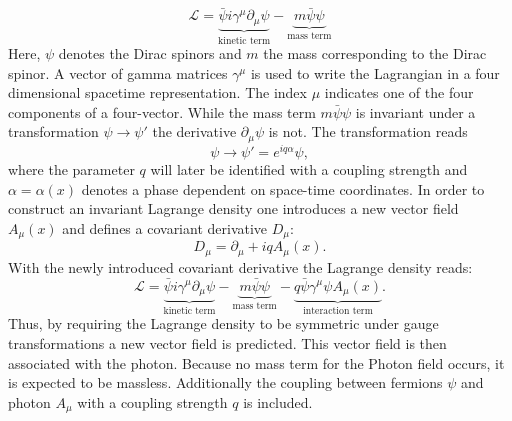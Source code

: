 	\begin{equation}
	\mathcal{L} = \underbrace{\bar{\psi} i \gamma^\mu \partial_\mu \psi}_{\text{kinetic term}} - \underbrace{m \bar{\psi} \psi}_{\text{mass term}}
	\label{eq:qedlag}
	\end{equation}
	Here, $\psi$ denotes the Dirac spinors and $m$ the mass corresponding to the Dirac spinor. A vector of gamma matrices $\gamma^\mu$ is used to write the Lagrangian in a four dimensional spacetime representation. The index $\mu$ indicates one of the four components of a four-vector. While the mass term $m \bar{\psi} \psi$ is invariant under a transformation $\psi \rightarrow \psi'$ the derivative $\partial_\mu \psi$ is not. The transformation reads
	\begin{equation}
	\psi \rightarrow \psi' = e^{i q \alpha} \psi,
	\label{eq:trafo}
	\end{equation}
	where the parameter $q$ will later be identified with a coupling strength and $\alpha = \alpha(x)$ denotes a phase dependent on space-time coordinates. In order to construct an invariant Lagrange density one introduces a new vector field $A_\mu(x)$ and defines a covariant derivative $D_\mu$:
	\begin{equation}
	D_\mu = \partial_\mu + i q A_\mu(x).
	\end{equation}
	With the newly introduced covariant derivative the Lagrange density reads:
	\begin{equation}
	\mathcal{L} = \underbrace{\bar{\psi} i \gamma^\mu \partial_\mu \psi}_{\text{kinetic term}} - \underbrace{m \bar{\psi} \psi}_{\text{mass term}} - \underbrace{q \bar{\psi} \gamma^\mu \psi A_\mu(x)}_{\text{interaction term}}.
	\end{equation}
	Thus, by requiring the Lagrange density to be symmetric under gauge transformations a new vector field is predicted. This vector field is then associated with the photon. Because no mass term for the Photon field occurs, it is expected to be massless. Additionally the coupling between fermions $\psi$ and photon $A_\mu$ with a coupling strength $q$ is included. \cite{ModernParticlePhysics}
	
